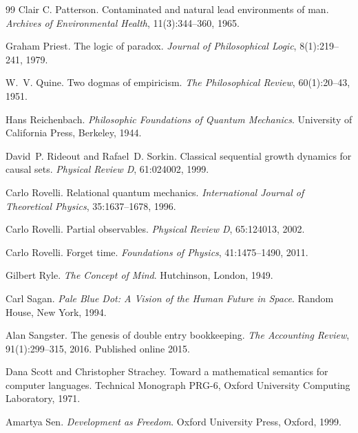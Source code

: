 \documentclass[11pt,a4paper]{article}
\theoremstyle{remark}\newtheorem{remark}[definition]{Remark}
\begin{document}
\begin{thebibliography}{99}
Clair C. Patterson.
\newblock Contaminated and natural lead environments of man.
\newblock \emph{Archives of Environmental Health}, 11(3):344--360, 1965.

Graham Priest.
\newblock The logic of paradox.
\newblock \emph{Journal of Philosophical Logic}, 8(1):219--241, 1979.

W.~V. Quine.
\newblock Two dogmas of empiricism.
\newblock \emph{The Philosophical Review}, 60(1):20--43, 1951.

Hans Reichenbach.
\newblock \emph{Philosophic Foundations of Quantum Mechanics}.
\newblock University of California Press, Berkeley, 1944.

David~P. Rideout and Rafael~D. Sorkin.
\newblock Classical sequential growth dynamics for causal sets.
\newblock \emph{Physical Review D}, 61:024002, 1999.

Carlo Rovelli.
\newblock Relational quantum mechanics.
\newblock \emph{International Journal of Theoretical Physics}, 35:1637--1678, 1996.

Carlo Rovelli.
\newblock Partial observables.
\newblock \emph{Physical Review D}, 65:124013, 2002.

Carlo Rovelli.
\newblock Forget time.
\newblock \emph{Foundations of Physics}, 41:1475--1490, 2011.

Gilbert Ryle.
\newblock \emph{The Concept of Mind}.
\newblock Hutchinson, London, 1949.

Carl Sagan.
\newblock \emph{Pale Blue Dot: A Vision of the Human Future in Space}.
\newblock Random House, New York, 1994.

Alan Sangster.
\newblock The genesis of double entry bookkeeping.
\newblock \emph{The Accounting Review}, 91(1):299--315, 2016.
\newblock Published online 2015.

Dana Scott and Christopher Strachey.
\newblock Toward a mathematical semantics for computer languages.
\newblock Technical Monograph PRG-6, Oxford University Computing Laboratory, 1971.

Amartya Sen.
\newblock \emph{Development as Freedom}.
\newblock Oxford University Press, Oxford, 1999.


\end{thebibliography}
\end{document}
